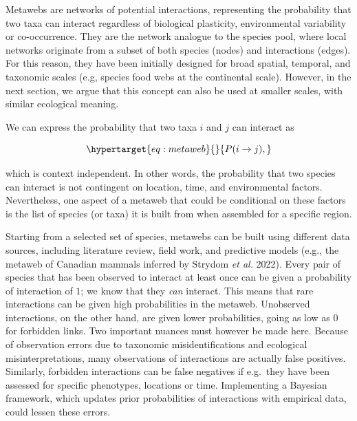 \documentclass[10pt,oneside]{article}
\begin{document}
Metawebs are networks of potential interactions, representing the
probability that two taxa can interact regardless of biological
plasticity, environmental variability or co-occurrence. They are the
network analogue to the species pool, where local networks originate
from a subset of both species (nodes) and interactions (edges). For this
reason, they have been initially designed for broad spatial, temporal,
and taxonomic scales (e.g, species food webs at the continental scale).
However, in the next section, we argue that this concept can also be
used at smaller scales, with similar ecological meaning.

We can express the probability that two taxa \(i\) and \(j\) can
interact as

\begin{equation}\protect\hypertarget{eq:metaweb}{}{P(i \rightarrow j),}\label{eq:metaweb}\end{equation}

which is context independent. In other words, the probability that two
species can interact is not contingent on location, time, and
environmental factors. Nevertheless, one aspect of a metaweb that could
be conditional on these factors is the list of species (or taxa) it is
built from when assembled for a specific region.

Starting from a selected set of species, metawebs can be built using
different data sources, including literature review, field work, and
predictive models (e.g., the metaweb of Canadian mammals inferred by
Strydom \emph{et al.} 2022). Every pair of species that has been
observed to interact at least once can be given a probability of
interaction of \(1\); we know that they \emph{can} interact. This means
that rare interactions can be given high probabilities in the metaweb.
Unobserved interactions, on the other hand, are given lower
probabilities, going as low as \(0\) for forbidden links. Two important
nuances must however be made here. Because of observation errors due to
taxonomic misidentifications and ecological misinterpretations, many
observations of interactions are actually false positives. Similarly,
forbidden interactions can be false negatives if e.g.~they have been
assessed for specific phenotypes, locations or time. Implementing a
Bayesian framework, which updates prior probabilities of interactions
with empirical data, could lessen these errors.
\end{document}
